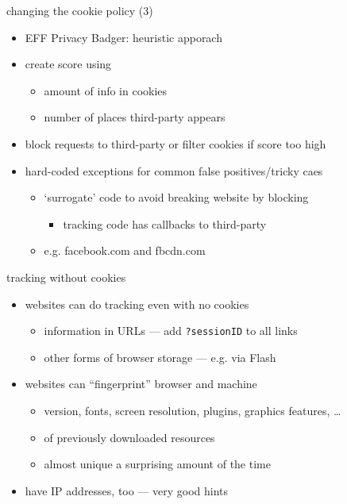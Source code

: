 \begin{frame}{changing the cookie policy (3)}
    \begin{itemize}
    \item EFF Privacy Badger: heuristic apporach
    \item create score using 
        \begin{itemize}
        \item amount of info in cookies
        \item number of places third-party appears
        \end{itemize}
    \item block requests to third-party or filter cookies if score too high
    \item hard-coded exceptions for common false positives/tricky caes
        \begin{itemize}
        \item `surrogate' code to avoid breaking website by blocking
            \begin{itemize}
            \item tracking code has callbacks to third-party
            \end{itemize}
        \item e.g. facebook.com and fbcdn.com
        \end{itemize}
    \end{itemize}
\end{frame}

\begin{frame}[fragile,label=noCookieTrack]{tracking without cookies}
    \begin{itemize}
    \item websites can do tracking even with no cookies
        \begin{itemize}
        \item information in URLs --- add \texttt{?sessionID} to all links
        \item other forms of browser storage --- e.g. via Flash
        \end{itemize}
    \item websites can ``fingerprint'' browser and machine
        \begin{itemize}
        \item version, fonts, screen resolution, plugins, graphics features, \ldots
        \item {} of previously downloaded resources
        \item almost unique a surprising amount of the time
        \end{itemize}
    \item have IP addresses, too --- very good hints
    \end{itemize}
\end{frame}

